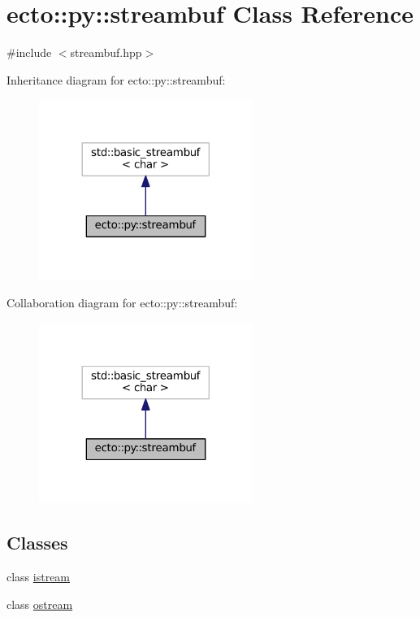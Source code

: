 \hypertarget{classecto_1_1py_1_1streambuf}{}\section{ecto\+:\+:py\+:\+:streambuf Class Reference}
\label{classecto_1_1py_1_1streambuf}


{\ttfamily \#include $<$streambuf.\+hpp$>$}



Inheritance diagram for ecto\+:\+:py\+:\+:streambuf\+:\nopagebreak
\begin{figure}[H]
\begin{center}
\leavevmode
\includegraphics[width=197pt]{classecto_1_1py_1_1streambuf__inherit__graph}
\end{center}
\end{figure}


Collaboration diagram for ecto\+:\+:py\+:\+:streambuf\+:\nopagebreak
\begin{figure}[H]
\begin{center}
\leavevmode
\includegraphics[width=197pt]{classecto_1_1py_1_1streambuf__coll__graph}
\end{center}
\end{figure}
\subsection*{Classes}
\begin{DoxyCompactItemize}
\item 
class \hyperlink{classecto_1_1py_1_1streambuf_1_1istream}{istream}
\item 
class \hyperlink{classecto_1_1py_1_1streambuf_1_1ostream}{ostream}
\end{DoxyCompactItemize}
